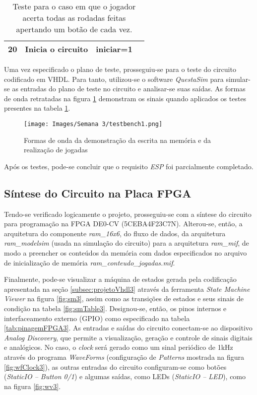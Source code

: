 \documentclass[amsmath,amssymb,floatfix]{report}
\begin{document}
\begin{table}[H]
\begin{tabular}{|cccc|}
\multicolumn{1}{|c|}{20}          & \multicolumn{1}{c|}{Inicia o circuito}       & \multicolumn{1}{c|}{iniciar=1}                                                          &                                                    \\ \hline
\end{tabular}
\caption{Teste para o caso em que o jogador acerta todas as rodadas feitas apertando um botão de cada vez.}
\label{tab:testbench31}
\end{table}

Uma vez especificado o plano de teste, prosseguiu-se para o teste do circuito codificado em VHDL. Para tanto, utilizou-se o software \textit{QuestaSim} para simular-se as entradas do plano de teste no circuito e analisar-se suas saídas. As formas de onda retratadas na figura \ref{fig:testbench31} demonstram os sinais quando aplicados os testes presentes na tabela \ref{tab:testbench31}. 

\begin{figure}[H]
    \centering
    \texttt{[image: Images/Semana 3/testbench1.png]}
    \caption{Formas de onda da demonstração da escrita na memória e da realização de jogadas}
    \label{fig:testbench31}
\end{figure}

Após os testes, pode-se concluir que o requisito \textit{ESP} foi parcialmente completado.

\subsection{Síntese do Circuito na Placa FPGA}
\label{subsec:sintese3}

Tendo-se verificado logicamente o projeto, prosseguiu-se com a síntese do circuito para programação na FPGA DE0-CV (5CEBA4F23C7N). Alterou-se, então, a arquitetura do componente \textit{ram\_16x6}, do fluxo de dados, da arquitetura \textit{ram\_modelsim} (usada na simulação do circuito) para a arquitetura \textit{ram\_mif}, de modo a preencher os conteúdos da memória com dados especificados no arquivo de inicialização de memória \textit{ram\_conteudo\_jogadas.mif}.

Finalmente, pode-se visualizar a máquina de estados gerada pela codificação apresentada na seção \ref{subsec:projetoVhdl3} através da ferramenta \textit{State Machine Viewer} na figura \ref{fig:sm3}, assim como as transições de estados e seus sinais de condição na tabela \ref{fig:smTable3}. Designou-se, então, os pinos internos e interfaceamento externo (GPIO) como especificado na tabela \ref{tab:pinagemFPGA3}. As entradas e saídas do circuito conectam-se ao dispositivo \textit{Analog Discovery}, que permite a visualização, geração e controle de sinais digitais e analógicos. No caso, o \textit{clock} será gerado como um sinal periódico de 1kHz através do programa \textit{WaveForms} (configuração de \textit{Patterns} mostrada na figura \ref{fig:wfClock3}), as outras entradas do circuito configuram-se como botões (\textit{StaticIO -- Button 0/1}) e algumas saídas, como LEDs (\textit{StaticIO -- LED}), como na figura \ref{fig:wv3}.
\end{document}
